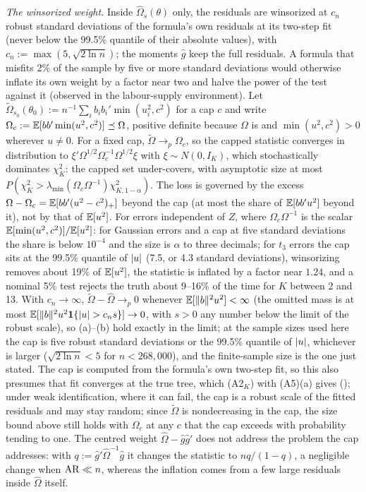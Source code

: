 \medskip\noindent\emph{The winsorized weight.} Inside $\hat\Omega_s(\theta)$ only, the residuals are winsorized at $c_n$ robust standard deviations of the formula's own residuals at its two-step fit (never below the 99.5\% quantile of their absolute values), with $c_n := \max(5, \sqrt{2\ln n})$; the moments $\hat g$ keep the full residuals. A formula that misfits 2\% of the sample by five or more standard deviations would otherwise inflate its own weight by a factor near two and halve the power of the test against it (observed in the labour-supply environment). Let $\tilde\Omega_{s_0}(\theta_0) := n^{-1}\sum_ib_ib_i'\min(u_i^2, c^2)$ for a cap $c$ and write $\Omega_c := \mathbb{E}[bb'\min(u^2, c^2)] \preceq \Omega$, positive definite because $\Omega$ is and $\min(u^2, c^2) > 0$ wherever $u \ne 0$. For a fixed cap, $\tilde\Omega \to_p \Omega_c$, so the capped statistic converges in distribution to $\xi'\Omega^{1/2}\Omega_c^{-1}\Omega^{1/2}\xi$ with $\xi \sim N(0, I_K)$, which stochastically dominates $\chi^2_K$: the capped set under-covers, with asymptotic size at most $P(\chi^2_K > \lambda_{\min}(\Omega_c\Omega^{-1})\chi^2_{K,1-\alpha})$. The loss is governed by the excess $\Omega - \Omega_c = \mathbb{E}[bb'(u^2 - c^2)_+]$ beyond the cap (at most the share of $\mathbb{E}[bb'u^2]$ beyond it), not by that of $\mathbb{E}[u^2]$. For errors independent of $Z$, where $\Omega_c\Omega^{-1}$ is the scalar $\mathbb{E}[\min(u^2, c^2)]/\mathbb{E}[u^2]$: for Gaussian errors and a cap at five standard deviations the share is below $10^{-4}$ and the size is $\alpha$ to three decimals; for $t_3$ errors the cap sits at the 99.5\% quantile of $\lvert u\rvert$ (7.5, or 4.3 standard deviations), winsorizing removes about 19\% of $\mathbb{E}[u^2]$, the statistic is inflated by a factor near $1.24$, and a nominal 5\% test rejects the truth about 9--16\% of the time for $K$ between 2 and 13. With $c_n \to \infty$, $\tilde\Omega - \hat\Omega \to_p 0$ whenever $\mathbb{E}[\lVert b\rVert^2u^2] < \infty$ (the omitted mass is at most $\mathbb{E}[\lVert b\rVert^2u^2\mathbf{1}\{\lvert u\rvert > c_ns\}] \to 0$, with $s > 0$ any number below the limit of the robust scale), so (a)--(b) hold exactly in the limit; at the sample sizes used here the cap is five robust standard deviations or the 99.5\% quantile of $\lvert u\rvert$, whichever is larger ($\sqrt{2\ln n} < 5$ for $n < 268{,}000$), and the finite-sample size is the one just stated. The cap is computed from the formula's own two-step fit, so this also presumes that fit converges at the true tree, which (A2$_K$) with (A5)(a) gives (); under weak identification, where it can fail, the cap is a robust scale of the fitted residuals and may stay random; since $\tilde\Omega$ is nondecreasing in the cap, the size bound above still holds with $\Omega_c$ at any $c$ that the cap exceeds with probability tending to one. The centred weight $\hat\Omega - \hat g\hat g'$ \citep{hall2000} does not address the problem the cap addresses: with $q := \hat g'\hat\Omega^{-1}\hat g$ it changes the statistic to $nq/(1 - q)$, a negligible change when $\mathrm{AR} \ll n$, whereas the inflation comes from a few large residuals inside $\hat\Omega$ itself.

